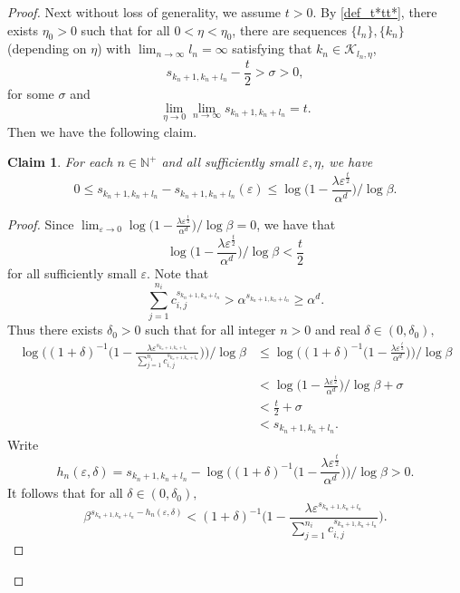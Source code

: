 \documentclass[12pt]{amsart}
\numberwithin{equation}{section}
\theoremstyle{plain}
\newtheorem*{claim}{Claim}
\theoremstyle{remark}
\theoremstyle{definition}
\newcommand{\kk}{\mathcal{K}}
\newcommand{\N}{\mathbb{N}}
\newcommand{\eps}{\varepsilon}
\newcommand{\de}{\delta}
\newcommand{\f}{\frac}
\newcommand{\s}{\sigma}
\newcommand{\lam}{\lambda}
\renewcommand{\ge}{\geqslant}
\renewcommand{\le}{\leqslant}
\begin{document}
\begin{proof}
		Next  without loss of generality, we assume  $t>0$. By \eqref{def_t*tt*},  there exists $\eta_0 > 0$ such that for all $0 < \eta < \eta_0$, there are sequences $\{l_n\},\{k_n\}$(depending on $\eta$) with $\lim_{n\to\infty }l_n=\infty$ satisfying  that $k_n\in \kk_{l_n,\eta}$, 
		\[
		s_{k_n+1,k_n+l_n}-\f{t}2>\s>0, 
		\]
		for some $\sigma$ and
		\begin{equation} \label{eqsknln=t}
			\lim_{\eta\to 0}\lim_{n\to\infty}s_{k_n+1,k_n+l_n}=t.
		\end{equation}
		Then we have the following claim.
		\begin{claim}
			For each $n\in \N^+$ and all sufficiently small $\eps,\eta$, we have
			\[
			0\le s_{k_n+1,k_n+l_n}-s_{k_n+1,k_n+l_n}(\eps)\le{\log\Big(1-\frac{\lam \eps^{\frac{t}2}}{\alpha^d}\Big)}\Big/{\log \beta}.
			\]
		\end{claim}
		\begin{proof}
			Since $\lim_{\eps\to0 }{\log\big(1-\frac{\lam \eps^{\frac{t}2}}{\alpha^d}\big)}\big/{\log \beta}= 0 $, we have that
			\[
			{\log\Big(1-\frac{\lam \eps^{\frac{t}2}}{\alpha^d}\Big)}\Big/{\log \beta}<\f{t}2
			\]
			for all sufficiently small $\eps$.  
			Note that
			\[
			\sum_{j=1}^{n_i}c_{i,j}^{s_{k_n+1,k_n+l_n}}> \alpha^{s_{k_n+1,k_n+l_n}}\ge \alpha^d.
			\]
			Thus there exists $\de_0>0$ such that for all integer $n>0$ and real $\de\in (0,\de_0),$
			\begin{equation*}%
				\begin{aligned}
					{\log\Big((1+\de)^{-1}\Big(1-\frac{\lam \eps^{s_{k_n+1,k_n+l_n}}}{\sum_{j=1}^{n_i}c_{i,j}^{s_{k_n+1,k_n+l_n}}}\Big)\Big)}\Big/{\log \beta}
					&\le{\log\Big((1+\de)^{-1}\Big(1-\frac{\lam \eps^{\frac{t}2}}{\alpha^d}\Big)\Big)}\Big/{\log \beta}\\
					&<{\log\Big(1-\frac{\lam \eps^{\frac{t}2}}{\alpha^d}\Big)}\Big/{\log \beta}+\sigma\\
					&<\frac{t}2+\sigma\\
					&<s_{k_n+1,k_n+l_n}.
				\end{aligned}
			\end{equation*}
			Write
			\[
			h_n(\eps,\de)=s_{k_n+1,k_n+l_n}-{\log\Big((1+\de)^{-1}\Big(1-\frac{\lam \eps^{\frac{t}2}}{\alpha^d}\Big)\Big)}\Big/{\log \beta}>0.
			\]
			It follows that   for all  $\de\in (0,\de_0),$       %
			\begin{equation}\label{beta}
				\beta^{s_{k_n+1,k_n+l_n}-h_n(\eps,\de)}<(1+\de)^{-1}\Big(1-\frac{\lam \eps^{s_{k_n+1,k_n+l_n}}}{\sum_{j=1}^{n_i}c_{i,j}^{s_{k_n+1,k_n+l_n}}}\Big) .

\end{equation}
\end{proof}
\end{proof}
\end{document}
